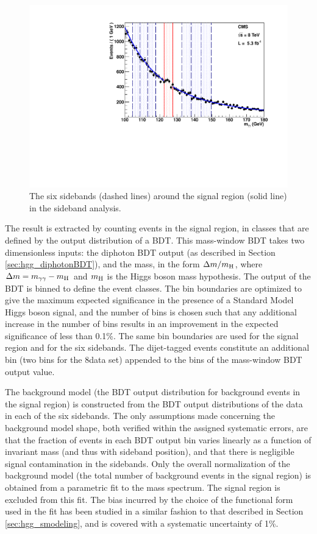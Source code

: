 \documentclass[11pt,twoside,a4paper,cmspaper,final,collab]{cms-tdr}
\begin{document}
\begin{figure}[htbp]
  \begin{center}
    \includegraphics[width=0.60\linewidth]{figures/fit_m125_0-1GeV}
    \caption{The six sidebands (dashed lines) around the signal region
      (solid line) in the sideband analysis. }
    \label{fig:hgg_sidebands}
  \end{center}
\end{figure}

The result is extracted by counting events in the signal region, in classes
that are defined by the output distribution of a BDT.
This mass-window BDT takes two dimensionless inputs: the diphoton BDT output (as described in
Section \ref{sec:hgg_diphotonBDT}), and the mass, in the form $\Delta m/m_{\mathrm{H}}$, where
$\Delta m =m_{\gamma\gamma} - m_{\mathrm{H}}$ and $m_{\mathrm{H}}$ is the Higgs boson mass hypothesis.
The output of the BDT is binned to define the event classes.
The bin boundaries are optimized to give the maximum expected significance in the presence of a Standard Model
Higgs boson signal, and the number of bins is chosen such that any additional increase in the number of bins
results in an improvement in the expected significance of less than 0.1\%.
The same bin boundaries are used for the signal region and for the six sidebands.
The dijet-tagged events constitute an additional bin (two bins for the 8\TeV data set)
appended to the bins of the mass-window BDT output value.

The background model (\ie the BDT output distribution for background events in the signal region) is constructed
from the BDT output distributions of the data in each of the six sidebands.
The only assumptions made concerning the background model shape, both verified within the assigned systematic errors,
are that the fraction of events in each BDT output bin varies linearly as a function of invariant mass
(and thus with sideband position), and that there is negligible signal contamination in the sidebands.
Only the overall normalization of the background model (the total number of background events in the signal region) is obtained from
a parametric fit to the mass spectrum. The signal region is excluded from this fit.  The bias incurred by the choice of the functional form used in the fit has been studied in a similar fashion to that described in Section \ref{sec:hgg_smodeling}, and is covered with a systematic uncertainty of 1\%.
\end{document}
